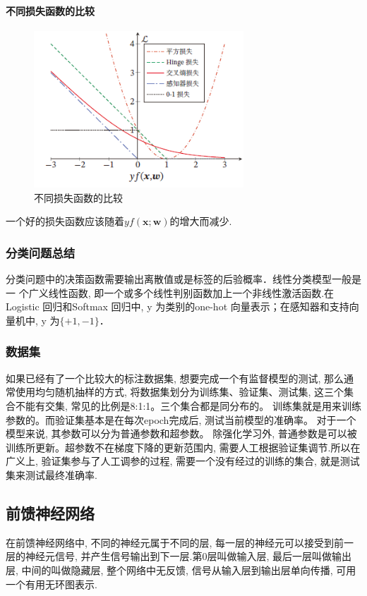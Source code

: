 \documentclass[a4paper]{article}
\begin{document}
\paragraph{不同损失函数的比较}
\begin{figure}
    \centering
    \includegraphics[width=0.7\textwidth]{loss_function.png}
    \caption{不同损失函数的比较}
\end{figure} 
一个好的损失函数应该随着$yf(\mathbf{x;w})$的增大而减少.

\subsubsection{分类问题总结}
分类问题中的决策函数需要输出离散值或是标签的后验概率．线性分类模型一般是一
个广义线性函数, 即一个或多个线性判别函数加上一个非线性激活函数.在Logistic 回归和Softmax 回归中, y 为类别的one-hot 向量表示；在感知器和支持向量机中, y 为$\{+1, -1\}$．



\subsubsection{数据集}
如果已经有了一个比较大的标注数据集, 想要完成一个有监督模型的测试, 那么通常使用均匀随机抽样的方式, 将数据集划分为训练集、验证集、测试集, 这三个集合不能有交集, 常见的比例是8:1:1。三个集合都是同分布的。
训练集就是用来训练参数的。而验证集基本是在每次epoch完成后, 测试当前模型的准确率。
对于一个模型来说, 其参数可以分为普通参数和超参数。 除强化学习外, 普通参数是可以被训练所更新。超参数不在梯度下降的更新范围内, 需要人工根据验证集调节.所以在广义上, 验证集参与了人工调参的过程, 需要一个没有经过的训练的集合, 就是测试集来测试最终准确率. \citep{training_validation_test_Su}


\subsection{前馈神经网络}
在前馈神经网络中, 不同的神经元属于不同的层, 每一层的神经元可以接受到前一层的神经元信号, 并产生信号输出到下一层.第0层叫做输入层, 最后一层叫做输出层, 中间的叫做隐藏层, 整个网络中无反馈, 信号从输入层到输出层单向传播, 可用一个有用无环图表示.
\end{document}
